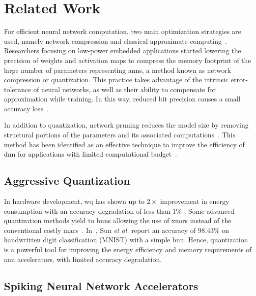 \section{Related Work}
For efficient neural network computation, two main optimization strategies are used, namely network compression and classical approximate computing~\cite{bouvier2019spiking}. Researchers focusing on low-power embedded applications started lowering the precision of weights and activation maps to compress the memory footprint of the large number of parameters representing \glspl{ann}, a method known as network compression or quantization. This practice takes advantage of the intrinsic error-tolerance of neural networks, as well as their ability to compensate for approximation while training. In this way, reduced bit precision causes a small accuracy loss~\cite{courbariaux2015binaryconnect, han2015deep, hubara2017quantized, rastegari2016xnor}.


In addition to quantization, network pruning reduces the model size by removing structural portions of the parameters and its associated computations~\cite{lecun1989optimal,hassibi1992second}. This method has been identified as an effective technique to improve the efficiency of \gls{dnn} for applications with limited computational budget~\cite{molchanov2016pruning,li2016pruning, liu2018rethinking}.


\subsection{Aggressive Quantization}
In hardware development, \gls{wq} has shown up to $2\times$ improvement in energy consumption with an accuracy degradation of less than $1\%$ \cite{moons20160, whatmough201714}. Some advanced quantization methods yield to \glspl{bnn} allowing the use of \glspl{xnor} instead of the conventional costly \glspl{mac}~\cite{rastegari2016xnor}. In~\cite{sun2018xnor}, Sun \textit{et al.} report an accuracy of $98.43\%$ on handwritten digit classification (MNIST) with a simple \gls{bnn}. Hence, quantization is a powerful tool for improving the energy efficiency and memory requirements of \gls{ann} accelerators, with limited accuracy degradation.

\subsection{Spiking Neural Network Accelerators}

